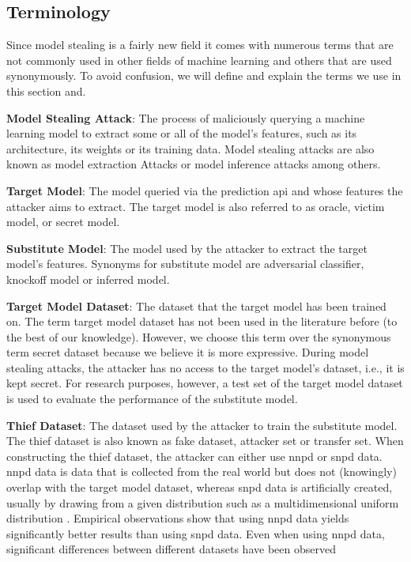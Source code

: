 \subsection{Terminology}
\label{sec:ModelStealing:Terminology}
Since model stealing is a fairly new field it comes with numerous terms that are not commonly used in other fields of machine learning and others that are used 
synonymously. To avoid confusion, we will define and explain the terms we use in this section and. \par
\textbf{Model Stealing Attack}: The process of maliciously querying a machine learning model to extract some or all of the model's features, such as its
architecture, its weights or its training data. Model stealing attacks are also known as model extraction Attacks or model inference attacks among others. \par
\textbf{Target Model}: The model queried via the prediction \gls{api} and whose features the attacker aims to extract. The target model is also referred to as oracle, victim model, or secret model. \par
\textbf{Substitute Model}: The model used by the attacker to extract the target model's features. Synonyms for substitute model are adversarial classifier,
knockoff model or inferred model. \par
\textbf{Target Model Dataset}: The dataset that the target model has been trained on. The term target model dataset has not been used in the literature before (to 
the best of our knowledge). However, we choose this term over the synonymous term secret dataset because we believe it is more expressive. During model stealing attacks,
the attacker has no access to the target model's dataset, i.e., it is kept secret. For research purposes, however, a test set of the target model dataset is
used to evaluate the performance of the substitute model. \par
\textbf{Thief Dataset}: The dataset used by the attacker to train the substitute model. The thief dataset is also known as fake dataset, attacker set or 
transfer set. When constructing the thief dataset, the attacker can either use \gls{nnpd} or \gls{snpd}
data. \gls{nnpd} data is data that is collected from the real world but does not (knowingly) overlap with the target model dataset, whereas \gls{snpd} data is artificially created,
usually by drawing from a given distribution such as a multidimensional uniform distribution \cite{pal2020activethief}. Empirical observations show that using \gls{nnpd} data
yields significantly better results than using \gls{snpd} data. Even when using \gls{nnpd} data, significant differences between different datasets have been observed 
